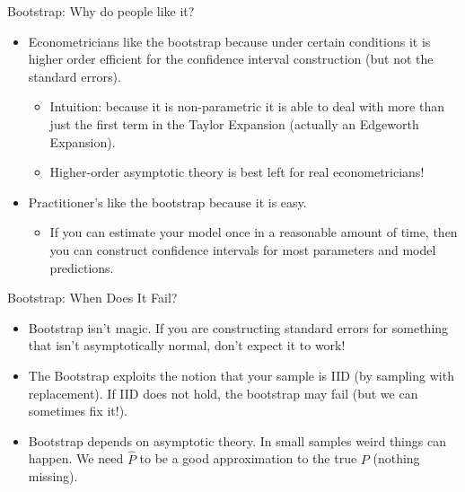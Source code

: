 \documentclass[aspectratio=169,11pt]{beamer}
\begin{document}
\begin{frame}{Bootstrap: Why do people like it?}
\begin{itemize}
\item Econometricians like the bootstrap because under certain conditions it is \alert{higher order efficient} for the confidence interval construction (but not the standard errors).
\begin{itemize}
\item Intuition: because it is non-parametric it is able to deal with more than just the first term in the Taylor Expansion (actually an \alert{Edgeworth Expansion}).
\item Higher-order asymptotic theory is best left for real econometricians!
\end{itemize}
\item Practitioner's like the bootstrap because it is easy.
\begin{itemize}
\item If you can estimate your model once in a reasonable amount of time, then you can construct confidence intervals for most parameters and model predictions.
\end{itemize}
\end{itemize}
\end{frame}

\begin{frame}{Bootstrap: When Does It Fail?}
\begin{itemize}
\item Bootstrap isn't magic. If you are constructing standard errors for something that isn't asymptotically normal, don't expect it to work!
\item The Bootstrap exploits the notion that your sample is IID (by sampling with replacement). If IID does not hold, the bootstrap may fail (but we can sometimes fix it!).
\item Bootstrap depends on asymptotic theory. In small samples weird things can happen. We need $\hat{P}$ to be a good approximation to the true $P$ (nothing missing).
\end{itemize}
\end{frame}
\end{document}
